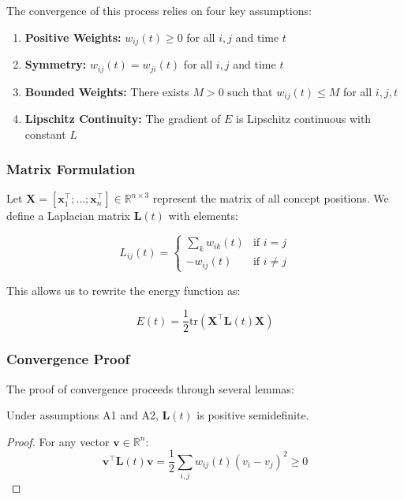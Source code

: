 \documentclass{article}
\begin{document}
The convergence of this process relies on four key assumptions:

\begin{enumerate}[label=A\arabic*.]
    \item \textbf{Positive Weights:} $w_{ij}(t) \geq 0$ for all $i,j$ and time $t$
    \item \textbf{Symmetry:} $w_{ij}(t) = w_{ji}(t)$ for all $i,j$ and time $t$
    \item \textbf{Bounded Weights:} There exists $M > 0$ such that $w_{ij}(t) \leq M$ for all $i,j,t$
    \item \textbf{Lipschitz Continuity:} The gradient of $E$ is Lipschitz continuous with constant $L$
\end{enumerate}

\subsubsection{Matrix Formulation}
Let $\mathbf{X} = [\mathbf{x}_1^\top; \ldots; \mathbf{x}_n^\top] \in \mathbb{R}^{n \times 3}$ represent the matrix of all concept positions. We define a Laplacian matrix $\mathbf{L}(t)$ with elements:

\begin{equation}
L_{ij}(t) = \begin{cases}
\sum_k w_{ik}(t) & \text{if } i = j \\
-w_{ij}(t) & \text{if } i \neq j
\end{cases}
\label{eq:laplacian}
\end{equation}

This allows us to rewrite the energy function as:

\begin{equation}
E(t) = \frac{1}{2}\text{tr}(\mathbf{X}^\top\mathbf{L}(t)\mathbf{X})
\label{eq:matrix_energy}
\end{equation}

\subsubsection{Convergence Proof}
The proof of convergence proceeds through several lemmas:

\begin{lemma}
Under assumptions A1 and A2, $\mathbf{L}(t)$ is positive semidefinite.
\end{lemma}

\begin{proof}
For any vector $\mathbf{v} \in \mathbb{R}^n$:
\begin{equation}
\mathbf{v}^\top\mathbf{L}(t)\mathbf{v} = \frac{1}{2}\sum_{i,j} w_{ij}(t)(v_i - v_j)^2 \geq 0
\end{equation}
\end{proof}
\end{document}
